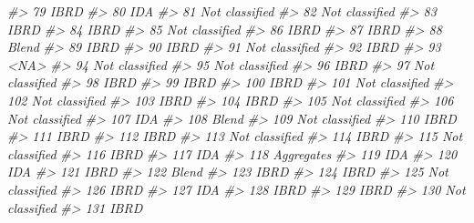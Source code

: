 \documentclass[
  xelatex, ja=standard]{bxjsbook}
\newenvironment{Shaded}{\begin{snugshade}}{\end{snugshade}}
\newcommand{\CommentTok}[1]{\textcolor[rgb]{0.56,0.35,0.01}{\textit{#1}}}
\theoremstyle{definition}
\theoremstyle{definition}
\theoremstyle{definition}
\theoremstyle{definition}
\theoremstyle{remark}
\begin{document}
\begin{Shaded}
\begin{Highlighting}[]
\CommentTok{\#\textgreater{} 79            IBRD}
\CommentTok{\#\textgreater{} 80             IDA}
\CommentTok{\#\textgreater{} 81  Not classified}
\CommentTok{\#\textgreater{} 82  Not classified}
\CommentTok{\#\textgreater{} 83            IBRD}
\CommentTok{\#\textgreater{} 84            IBRD}
\CommentTok{\#\textgreater{} 85  Not classified}
\CommentTok{\#\textgreater{} 86            IBRD}
\CommentTok{\#\textgreater{} 87            IBRD}
\CommentTok{\#\textgreater{} 88           Blend}
\CommentTok{\#\textgreater{} 89            IBRD}
\CommentTok{\#\textgreater{} 90            IBRD}
\CommentTok{\#\textgreater{} 91  Not classified}
\CommentTok{\#\textgreater{} 92            IBRD}
\CommentTok{\#\textgreater{} 93            \textless{}NA\textgreater{}}
\CommentTok{\#\textgreater{} 94  Not classified}
\CommentTok{\#\textgreater{} 95  Not classified}
\CommentTok{\#\textgreater{} 96            IBRD}
\CommentTok{\#\textgreater{} 97  Not classified}
\CommentTok{\#\textgreater{} 98            IBRD}
\CommentTok{\#\textgreater{} 99            IBRD}
\CommentTok{\#\textgreater{} 100           IBRD}
\CommentTok{\#\textgreater{} 101 Not classified}
\CommentTok{\#\textgreater{} 102 Not classified}
\CommentTok{\#\textgreater{} 103           IBRD}
\CommentTok{\#\textgreater{} 104           IBRD}
\CommentTok{\#\textgreater{} 105 Not classified}
\CommentTok{\#\textgreater{} 106 Not classified}
\CommentTok{\#\textgreater{} 107            IDA}
\CommentTok{\#\textgreater{} 108          Blend}
\CommentTok{\#\textgreater{} 109 Not classified}
\CommentTok{\#\textgreater{} 110           IBRD}
\CommentTok{\#\textgreater{} 111           IBRD}
\CommentTok{\#\textgreater{} 112           IBRD}
\CommentTok{\#\textgreater{} 113 Not classified}
\CommentTok{\#\textgreater{} 114           IBRD}
\CommentTok{\#\textgreater{} 115 Not classified}
\CommentTok{\#\textgreater{} 116           IBRD}
\CommentTok{\#\textgreater{} 117            IDA}
\CommentTok{\#\textgreater{} 118     Aggregates}
\CommentTok{\#\textgreater{} 119            IDA}
\CommentTok{\#\textgreater{} 120            IDA}
\CommentTok{\#\textgreater{} 121           IBRD}
\CommentTok{\#\textgreater{} 122          Blend}
\CommentTok{\#\textgreater{} 123           IBRD}
\CommentTok{\#\textgreater{} 124           IBRD}
\CommentTok{\#\textgreater{} 125 Not classified}
\CommentTok{\#\textgreater{} 126           IBRD}
\CommentTok{\#\textgreater{} 127            IDA}
\CommentTok{\#\textgreater{} 128           IBRD}
\CommentTok{\#\textgreater{} 129           IBRD}
\CommentTok{\#\textgreater{} 130 Not classified}
\CommentTok{\#\textgreater{} 131           IBRD}

\end{Highlighting}
\end{Shaded}
\end{document}
